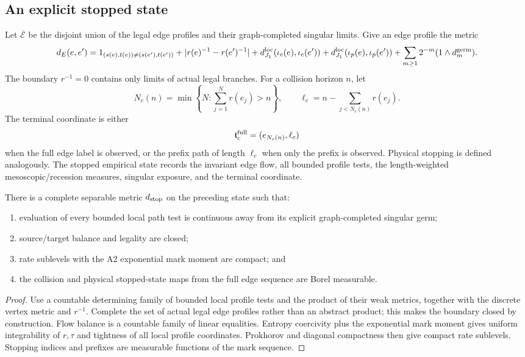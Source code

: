 \subsection{An explicit stopped state}

Let \(\overline{\mathcal E}\) be the disjoint union of the legal edge profiles
and their graph-completed singular limits.  Give an edge profile the metric
\[
 d_E(e,e')=1_{(s(e),t(e))\ne(s(e'),t(e'))}
 +|r(e)^{-1}-r(e')^{-1}|
 +d_{J_1}^{\rm loc}(\iota_c(e),\iota_c(e'))
 +d_{J_1}^{\rm loc}(\iota_p(e),\iota_p(e'))
 +\sum_{m\ge1}2^{-m}(1\wedge d_m^{\rm germ}).
\]
The boundary \(r^{-1}=0\) contains only limits of actual legal branches.  For a
collision horizon \(n\), let
\[
 N_c(n)=\min\left\{N:\sum_{j=1}^{N}r(e_j)>n\right\},
 \qquad
 \ell_c=n-\sum_{j<N_c(n)}r(e_j).
\]
The terminal coordinate is either
\[
 \mathfrak t_c^{\rm full}=(e_{N_c(n)},\ell_c)
\]
when the full edge label is observed, or the prefix path of length \(\ell_c\)
when only the prefix is observed.  Physical stopping is defined analogously.
The stopped empirical state records the invariant edge flow, all bounded
profile tests, the length-weighted mesoscopic/recession measures, singular
exposure, and the terminal coordinate.

\begin{proposition}
\label{prop:r16-a3-space}
There is a complete separable metric \(d_{\rm stop}\) on the preceding state
such that:
\begin{enumerate}[label=(\roman*)]
\item evaluation of every bounded local path test is continuous away from its
explicit graph-completed singular germ;
\item source/target balance and legality are closed;
\item rate sublevels with the A2 exponential mark moment are compact; and
\item the collision and physical stopped-state maps from the full edge sequence
are Borel measurable.
\end{enumerate}
\end{proposition}

\begin{proof}
Use a countable determining family of bounded local profile tests and the
product of their weak metrics, together with the discrete vertex metric and
\(r^{-1}\).  Complete the set of actual legal edge profiles rather than an
abstract product; this makes the boundary closed by construction.  Flow
balance is a countable family of linear equalities.  Entropy coercivity plus
the exponential mark moment gives uniform integrability of \(r,\tau\) and
tightness of all local profile coordinates.  Prokhorov and diagonal compactness
then give compact rate sublevels.  Stopping indices and prefixes are measurable
functions of the mark sequence.
\end{proof}

